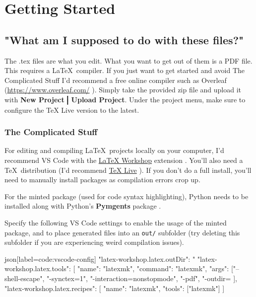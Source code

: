 \section{Getting Started}

\subsection{"What am I supposed to do with these files?"}

The .tex files are what you edit.
What you want to get out of them is a PDF file.
This requires a \LaTeX\ compiler.
If you just want to get started and avoid The Complicated Stuff I'd recommend a free online compiler such as Overleaf (\url{https://www.overleaf.com/} \parencite{overleaf}).
Simply take the provided zip file and upload it with \textbf{New Project$\big\bracevert$Upload Project}.
Under the project menu, make sure to configure the TeX Live version to the latest.

\subsubsection{The Complicated Stuff}

For editing and compiling \LaTeX\ projects locally on your computer, I'd recommend VS Code with the \href{https://marketplace.visualstudio.com/items?itemName=James-Yu.latex-workshop}{LaTeX Workshop} extension \parencite{workshop}.
You'll also need a \TeX\ distribution (I'd recommend \href{https://www.tug.org/texlive/acquire-netinstall.html}{TeX Live} \parencite{texlive}).
If you don't do a full install, you'll need to manually install packages as compilation errors crop up.

For the minted package (used for code syntax highlighting), Python needs to be installed along with Python's \textbf{Pymgents} package \parencite{pygmentize}.

Specify the following VS Code settings to enable the usage of the minted package, and to place generated files into an \texttt{out/} subfolder (try deleting this subfolder if you are experiencing weird compilation issues).
\begin{code}{json}[label=code:vscode-config]
"latex-workshop.latex.outDir": "%
"latex-workshop.latex.tools": [{
    "name": "latexmk",
    "command": "latexmk",
    "args": ["--shell-escape", "-synctex=1", "-interaction=nonstopmode", "-pdf", "-outdir=%
}],
"latex-workshop.latex.recipes": [{
    "name": "latexmk",
    "tools": ["latexmk"]
}]
\end{code}

